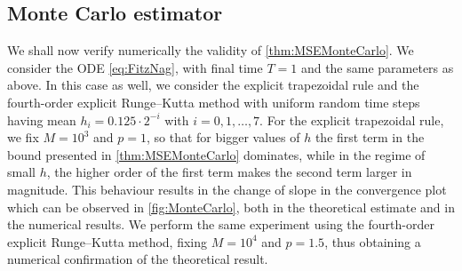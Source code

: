\documentclass[10pt]{article}
\begin{document}
\subsection{Monte Carlo estimator} 
We shall now verify numerically the validity of \cref{thm:MSEMonteCarlo}. We consider the ODE \eqref{eq:FitzNag}, with final time $T = 1$ and the same parameters as above. In this case as well, we consider the explicit trapezoidal rule and the fourth-order explicit Runge--Kutta method with uniform random time steps having mean $h_i = 0.125\cdot 2^{-i}$ with $i = 0, 1, \ldots, 7$. For the explicit trapezoidal rule, we fix $M = 10^3$ and $p = 1$, so that for bigger values of $h$ the first term in the bound presented in \cref{thm:MSEMonteCarlo} dominates, while in the regime of small $h$, the higher order of the first term makes the second term larger in magnitude. This behaviour results in the change of slope in the convergence plot which can be observed in \cref{fig:MonteCarlo}, both in the theoretical estimate and in the numerical results. We perform the same experiment using the fourth-order explicit Runge--Kutta method, fixing $M = 10^4$ and $p = 1.5$, thus obtaining a numerical confirmation of the theoretical result.
\end{document}
